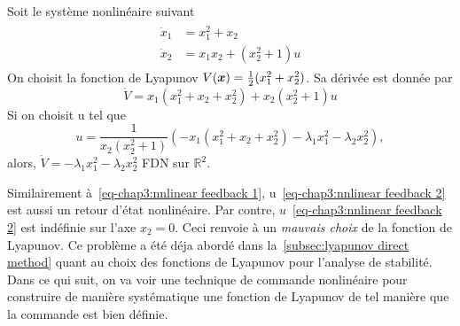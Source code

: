 \begin{example}
	Soit le système nonlinéaire suivant 
	\begin{align}\label{eq-chap3:expl nnsys}
		\begin{split}
			\dot{x}_1 &= x_1^2 + x_2 \\
			\dot{x}_2 &= x_1x_2 + (x_2^2+1)u
		\end{split}		
	\end{align}
	On choisit la fonction de Lyapunov $V(\bm{x}) = \frac{1}{2}(x_1^2 + x_2^2)$. Sa dérivée est donnée par 
	\begin{equation*}
		\dot{V} = x_1(x_1^2 + x_2 + x_2^2) + x_2(x_2^2 +1)u
	\end{equation*}
	Si on  choisit  u tel que 
	\begin{equation}\label{eq-chap3:nnlinear feedback 2}
		u=\frac{1}{x_2(x_2^2+1)}\left(-x_1(x_1^2 + x_2 + x_2^2)  - \lambda_1x_1^2 -\lambda_2x_2^2\right),
	\end{equation}
	alors, $\dot{V} = - \lambda_1x_1^2 -\lambda_2x_2^2$ FDN sur $\mathbb{R}^2$. 
\end{example}
Similairement à~\eqref{eq-chap3:nnlinear feedback 1}, u~\eqref{eq-chap3:nnlinear feedback 2} est aussi un retour d'état nonlinéaire. Par contre, $u$~\eqref{eq-chap3:nnlinear feedback 2} est indéfinie sur l'axe $x_2=0$. Ceci  renvoie à un \emph{mauvais choix} de la fonction de Lyapunov. Ce problème a été déja abordé dans la~\cref{subsec:lyapunov direct method} quant au choix des fonctions de Lyapunov pour l'analyse de stabilité. Dans ce qui suit, on va voir une technique de commande nonlinéaire pour construire de manière systématique une fonction de Lyapunov de tel manière que la commande est bien définie.  
